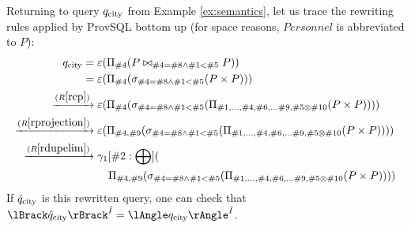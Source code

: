 \begin{example}\label{ex:rewriting}
	Returning to query $q_{\mathrm{city}}$ from Example \ref{ex:semantics}, let us trace
	the rewriting rules applied by ProvSQL bottom up (for space reasons,
	$\mathit{Personnel}$ is abbreviated to $P$):
	\begin{align*}
		q_{\mathrm{city}}={}                              & \varepsilon(\Pi_{\#4}(P\bowtie_{\#4=\#8\land\#1<\#5}P))                                                              \\
		={}                                  & \varepsilon(\Pi_{\#4}(\sigma_{\#4=\#8\land\#1<\#5}(P\times P)))                                                      \\
		\xrightarrow{(R\ref{rcp})}{}         & \varepsilon(\Pi_{\#4}(\sigma_{\#4=\#8\land\#1<\#5}(\Pi_{\#1,\dots,\#4,\#6,\dots\#9,\#5\otimes\#10}(P\times P))))     \\
		\xrightarrow{(R\ref{rprojection})}{} & \varepsilon(\Pi_{\#4,\#9}(\sigma_{\#4=\#8\land\#1<\#5}(\Pi_{\#1,\dots,\#4,\#6,\dots\#9,\#5\otimes\#10}(P\times P)))) \\
		\xrightarrow{(R\ref{rdupelim})}{}    &
		\gamma_{1}[\#2:\bigoplus](                                                                                                                               \\
		                                     & \quad\Pi_{\#4,\#9}(\sigma_{\#4=\#8\land\#1<\#5}(\Pi_{\#1,\dots,\#4,\#6,\dots\#9,\#5\otimes\#10}(P\times
		P))))
	\end{align*}
	If $\hat q_{\mathrm{city}}$ is this rewritten query, one can check that
	$\sem{\hat I}{\qexhat}=\ansem{\hat I}{\qex}$.
\end{example}
